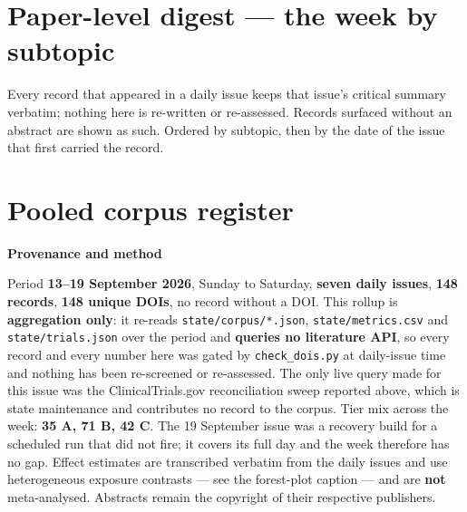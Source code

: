 \documentclass[10pt]{article}
\begin{document}
\clearpage

\section*{\sffamily\bfseries\color{Deep}Paper-level digest --- the week by subtopic}
\vspace{-1.5mm}{\color{Teal}\rule{\linewidth}{1.1pt}}\vspace{1mm}

{\fontsize{7.4}{9}\selectfont\color{Slate}Every record that appeared in a daily issue
keeps that issue's critical summary verbatim; nothing here is re-written or re-assessed.
Records surfaced without an abstract are shown as such. Ordered by subtopic, then by the
date of the issue that first carried the record.\par}



\section*{\sffamily\bfseries\color{Deep}Pooled corpus register}
\vspace{-1.5mm}{\color{Teal}\rule{\linewidth}{1.1pt}}\vspace{2.5mm}



\vspace{4mm}
\begin{keybox}
{\sffamily\bfseries\footnotesize\color{Deep}Provenance and method}\\[1.2mm]
{\fontsize{7.2}{8.8}\selectfont
Period \textbf{13--19 September 2026}, Sunday to Saturday, \textbf{seven daily issues},
\textbf{148 records}, \textbf{148 unique DOIs}, no record without a DOI. This rollup is
\textbf{aggregation only}: it re-reads \texttt{state/corpus/*.json},
\texttt{state/metrics.csv} and \texttt{state/trials.json} over the period and
\textbf{queries no literature API}, so every record and every number here was gated by
\texttt{check\_dois.py} at daily-issue time and nothing has been re-screened or
re-assessed. The only live query made for this issue was the ClinicalTrials.gov
reconciliation sweep reported above, which is state maintenance and contributes no record
to the corpus. Tier mix across the week: \textbf{35 A, 71 B, 42 C}. The 19 September issue
was a recovery build for a scheduled run that did not fire; it covers its full day and the
week therefore has no gap. Effect estimates are transcribed verbatim from the daily issues
and use heterogeneous exposure contrasts --- see the forest-plot caption --- and are
\textbf{not} meta-analysed. Abstracts remain the copyright of their respective
publishers.\par}
\end{keybox}
\end{document}
